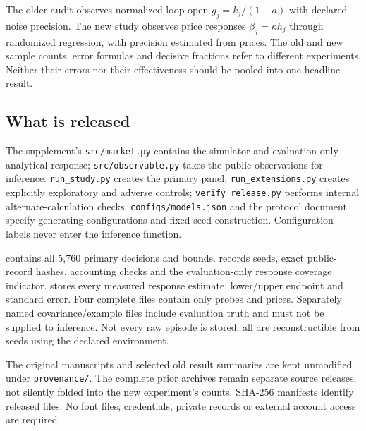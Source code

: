 \documentclass[11pt,a4paper]{article}
\theoremstyle{definition}
\theoremstyle{remark}
\begin{document}
The older audit observes normalized loop-open $g_j=k_j/(1-a)$ with declared noise precision. The new study observes price responses $\beta_j=\kappa h_j$ through randomized regression, with precision estimated from prices. The old and new sample counts, error formulas and decisive fractions refer to different experiments. Neither their errors nor their effectiveness should be pooled into one headline result.

\subsection{What is released}
The supplement's \texttt{src/market.py} contains the simulator and evaluation-only analytical response; \texttt{src/observable.py} takes the public observations for inference. \texttt{run\_study.py} creates the primary panel; \texttt{run\_extensions.py} creates explicitly exploratory and adverse controls; \texttt{verify\_release.py} performs internal alternate-calculation checks. \texttt{configs/models.json} and the protocol document specify generating configurations and fixed seed construction. Configuration labels never enter the inference function.

 contains all 5,760 primary decisions and bounds.  records seeds, exact public-record hashes, accounting checks and the evaluation-only response coverage indicator.  stores every measured response estimate, lower/upper endpoint and standard error. Four complete  files contain only probes and prices. Separately named covariance/example files include evaluation truth and must not be supplied to inference. Not every raw episode is stored; all are reconstructible from seeds using the declared environment.

The original manuscripts and selected old result summaries are kept unmodified under \texttt{provenance/}. The complete prior archives remain separate source releases, not silently folded into the new experiment's counts. SHA-256 manifests identify released files. No font files, credentials, private records or external account access are required.
\end{document}
